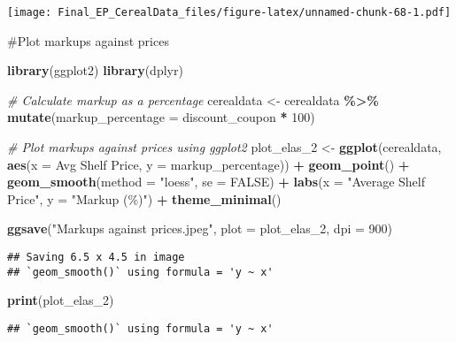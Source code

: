 \documentclass[
]{article}
\newenvironment{Shaded}{\begin{snugshade}}{\end{snugshade}}
\newcommand{\AttributeTok}[1]{\textcolor[rgb]{0.13,0.29,0.53}{#1}}
\newcommand{\CommentTok}[1]{\textcolor[rgb]{0.56,0.35,0.01}{\textit{#1}}}
\newcommand{\ConstantTok}[1]{\textcolor[rgb]{0.56,0.35,0.01}{#1}}
\newcommand{\DecValTok}[1]{\textcolor[rgb]{0.00,0.00,0.81}{#1}}
\newcommand{\FunctionTok}[1]{\textcolor[rgb]{0.13,0.29,0.53}{\textbf{#1}}}
\newcommand{\NormalTok}[1]{#1}
\newcommand{\OtherTok}[1]{\textcolor[rgb]{0.56,0.35,0.01}{#1}}
\newcommand{\SpecialCharTok}[1]{\textcolor[rgb]{0.81,0.36,0.00}{\textbf{#1}}}
\newcommand{\StringTok}[1]{\textcolor[rgb]{0.31,0.60,0.02}{#1}}
\begin{document}
\texttt{[image: Final\_EP\_CerealData\_files/figure-latex/unnamed-chunk-68-1.pdf]}

\#Plot markups against prices

\begin{Shaded}
\begin{Highlighting}[]
\FunctionTok{library}\NormalTok{(ggplot2)}
\FunctionTok{library}\NormalTok{(dplyr)}

\CommentTok{\# Calculate markup as a percentage}
\NormalTok{cerealdata }\OtherTok{\textless{}{-}}\NormalTok{ cerealdata }\SpecialCharTok{\%\textgreater{}\%}
  \FunctionTok{mutate}\NormalTok{(}\AttributeTok{markup\_percentage =}\NormalTok{ discount\_coupon }\SpecialCharTok{*} \DecValTok{100}\NormalTok{)}

\CommentTok{\# Plot markups against prices using ggplot2}
\NormalTok{plot\_elas\_2 }\OtherTok{\textless{}{-}} \FunctionTok{ggplot}\NormalTok{(cerealdata, }\FunctionTok{aes}\NormalTok{(}\AttributeTok{x =} \StringTok{\textasciigrave{}}\AttributeTok{Avg Shelf Price}\StringTok{\textasciigrave{}}\NormalTok{, }\AttributeTok{y =}\NormalTok{ markup\_percentage)) }\SpecialCharTok{+}
  \FunctionTok{geom\_point}\NormalTok{() }\SpecialCharTok{+}
  \FunctionTok{geom\_smooth}\NormalTok{(}\AttributeTok{method =} \StringTok{"loess"}\NormalTok{, }\AttributeTok{se =} \ConstantTok{FALSE}\NormalTok{) }\SpecialCharTok{+}
  \FunctionTok{labs}\NormalTok{(}\AttributeTok{x =} \StringTok{"Average Shelf Price"}\NormalTok{, }\AttributeTok{y =} \StringTok{"Markup (\%)"}\NormalTok{) }\SpecialCharTok{+}
  \FunctionTok{theme\_minimal}\NormalTok{()}

\FunctionTok{ggsave}\NormalTok{(}\StringTok{"Markups against prices.jpeg"}\NormalTok{, }\AttributeTok{plot =}\NormalTok{ plot\_elas\_2, }\AttributeTok{dpi =} \DecValTok{900}\NormalTok{)}
\end{Highlighting}
\end{Shaded}

\begin{verbatim}
## Saving 6.5 x 4.5 in image
## `geom_smooth()` using formula = 'y ~ x'
\end{verbatim}

\begin{Shaded}
\begin{Highlighting}[]
\FunctionTok{print}\NormalTok{(plot\_elas\_2)}
\end{Highlighting}
\end{Shaded}

\begin{verbatim}
## `geom_smooth()` using formula = 'y ~ x'
\end{verbatim}
\end{document}

